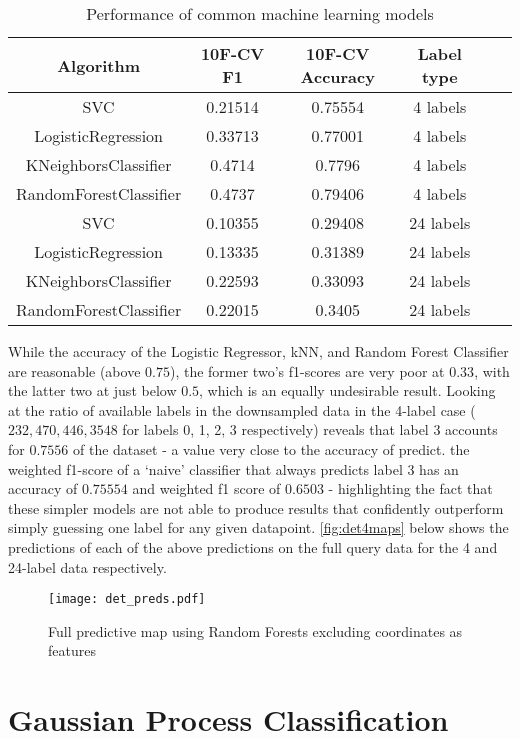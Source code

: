 \begin{table}[H]
    \centering
\begin{tabular}{|c|c|c|c|c|c|}
    \hline
    Algorithm & 10F-CV F1 & 10F-CV Accuracy & Label type\\\hline
    SVC & 0.21514 & 0.75554 & 4 labels \\
    LogisticRegression & 0.33713 & 0.77001 & 4 labels \\
    KNeighborsClassifier & 0.4714 & 0.7796 & 4 labels \\
    RandomForestClassifier & 0.4737 & 0.79406 & 4 labels \\
    SVC & 0.10355 & 0.29408 & 24 labels \\
    LogisticRegression & 0.13335 & 0.31389 & 24 labels \\
    KNeighborsClassifier & 0.22593 & 0.33093 & 24 labels \\
    RandomForestClassifier & 0.22015 & 0.3405 & 24 labels \\
    \hline
\end{tabular}
\label{table:detresults}
    \caption{Performance of common machine learning models}
\end{table}

While the accuracy of the Logistic Regressor, kNN, and Random Forest Classifier are reasonable (above $0.75$), the former two's f1-scores are very poor at $0.33$, with the latter two at just below $0.5$, which is an equally undesirable result. Looking at the ratio of available labels in the downsampled data in the 4-label case ($232,  470,  446, 3548$ for labels 0, 1, 2, 3 respectively) reveals that label 3 accounts for $0.7556$ of the dataset - a value very close to the accuracy of predict. the weighted f1-score of a `naive' classifier that always predicts label 3 has an accuracy of  $0.75554$ and weighted f1 score of $0.6503$ - highlighting the fact that these simpler models are not able to produce results that confidently outperform simply guessing one label for any given datapoint. \autoref{fig:det4maps} below shows the predictions of each of the above predictions on the full query data for the 4 and 24-label data respectively.

\begin{figure}[H]
    \texttt{[image: det\_preds.pdf]}
    \caption{Full predictive map using Random Forests excluding coordinates as features}
    \label{fig:det4maps}
\end{figure}

\section{Gaussian Process Classification}

